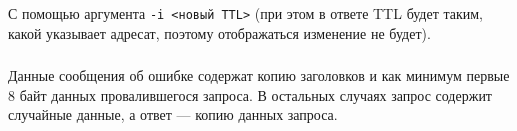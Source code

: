 \subsubsection{}
С помощью аргумента \texttt{-i <новый TTL>}
(при этом в ответе TTL будет таким, какой указывает адресат, поэтому отображаться изменение не будет).

\subsubsection{}
Данные сообщения об ошибке содержат копию заголовков и как минимум первые 8 байт данных провалившегося запроса.
В остальных случаях запрос содержит случайные данные, а ответ --- копию данных запроса.
